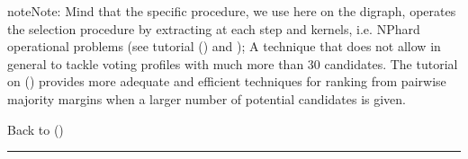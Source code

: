 \documentclass[a4paper,12pt,english]{sphinxhowto}
\begin{document}
\begin{sphinxadmonition}{note}{Note:}
Mind that the specific  procedure, we use here on the  digraph, operates the selection procedure by extracting at each step  and  kernels, i.e. NP\sphinxhyphen{}hard operational problems (see tutorial {\hyperref[\detokenize{tutorial:kernel-tutorial-label}]{}} () and ); A technique that does not allow in general to tackle voting profiles with much more than 30 candidates. The tutorial on {\hyperref[\detokenize{tutorial:ranking-tutorial-label}]{}} () provides more adequate and efficient techniques for ranking from pairwise majority margins when a larger number of potential candidates is given.
\end{sphinxadmonition}

Back to {\hyperref[\detokenize{tutorial:tutorial-label}]{}} ()


\bigskip\hrule\bigskip
\end{document}
